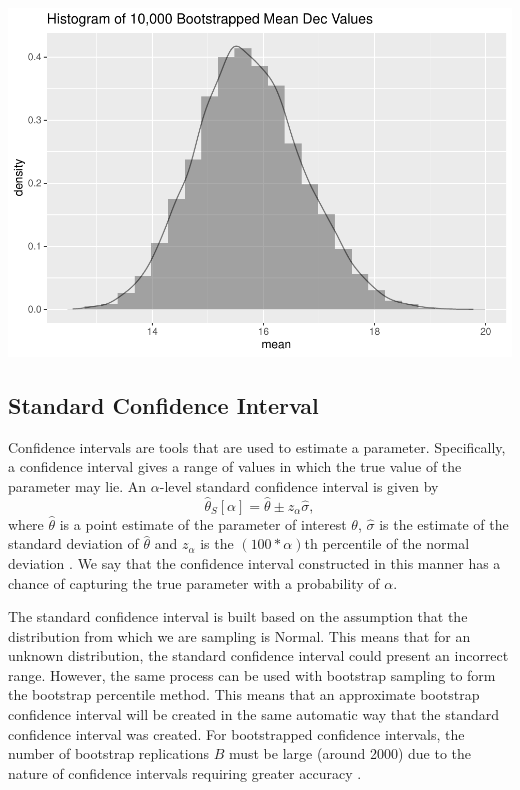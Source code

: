 \documentclass[12pt]{article}
\begin{document}
\includegraphics{paper_files/figure-latex/unnamed-chunk-3-1.pdf}

\hypertarget{standard-confidence-interval}{%
\subsection{Standard Confidence
Interval}\label{standard-confidence-interval}}

Confidence intervals are tools that are used to estimate a parameter.
Specifically, a confidence interval gives a range of values in which the
true value of the parameter may lie. An \(\alpha\)-level standard
confidence interval is given by
\[\hat{\theta}_S[\alpha] = \hat{\theta} \pm z_{\alpha}\hat{\sigma},\]
where \(\hat{\theta}\) is a point estimate of the parameter of interest
\(\theta\), \(\hat{\sigma}\) is the estimate of the standard deviation
of \(\hat{\theta}\) and \(z_{\alpha}\) is the \((100 *\alpha)\)th
percentile of the normal deviation \citep{Efron86}. We say that the
confidence interval constructed in this manner has a chance of capturing
the true parameter with a probability of \(\alpha\).

The standard confidence interval is built based on the assumption that
the distribution from which we are sampling is Normal. This means that
for an unknown distribution, the standard confidence interval could
present an incorrect range. However, the same process can be used with
bootstrap sampling to form the bootstrap percentile method. This means
that an approximate bootstrap confidence interval will be created in the
same automatic way that the standard confidence interval was created.
For bootstrapped confidence intervals, the number of bootstrap
replications \(B\) must be large (around 2000) due to the nature of
confidence intervals requiring greater accuracy \citep{Efron86}.
\end{document}
